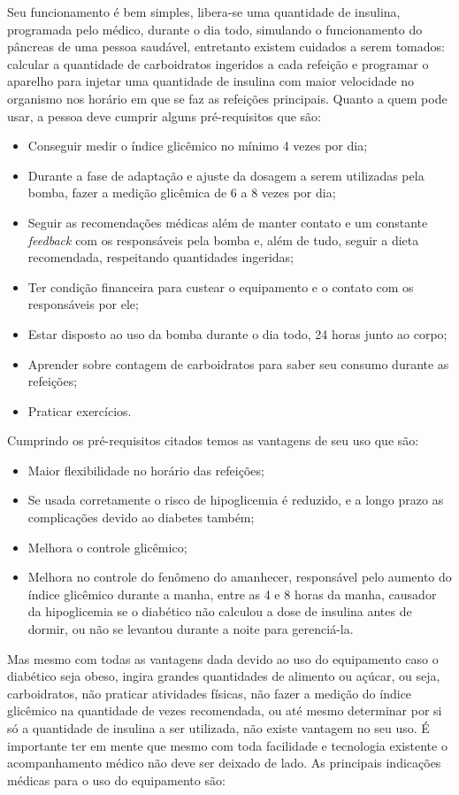 Seu funcionamento é bem simples, libera-se uma quantidade de insulina, programada pelo médico, durante o dia todo, simulando o funcionamento do pâncreas de uma pessoa saudável, entretanto existem cuidados a serem tomados: calcular a quantidade de carboidratos ingeridos a cada refeição e programar o aparelho para injetar uma quantidade de insulina com maior velocidade no organismo nos horário em que se faz as refeições principais.
Quanto a quem pode usar, a pessoa deve cumprir alguns pré-requisitos que são:
\begin{itemize}
\item Conseguir medir o índice glicêmico no mínimo 4 vezes por dia;
\item Durante a fase de adaptação e ajuste da dosagem a serem utilizadas pela bomba, fazer a medição glicêmica de 6 a 8 vezes por dia;
\item Seguir as recomendações médicas além de manter contato e um constante \emph{feedback} com os responsáveis pela bomba e, além de tudo, seguir a dieta recomendada, respeitando quantidades ingeridas;
\item Ter condição financeira para custear o equipamento e o contato com os responsáveis por ele;
\item Estar disposto ao uso da bomba durante o dia todo, 24 horas junto ao corpo;
\item Aprender sobre contagem de carboidratos para saber seu consumo durante as refeições;
\item Praticar exercícios.
\end{itemize}

Cumprindo os pré-requisitos citados temos as vantagens de seu uso que são:

\begin{itemize}
\item Maior flexibilidade no horário das refeições;
\item Se usada corretamente o risco de hipoglicemia é reduzido, e a longo prazo as complicações devido ao diabetes também;
\item Melhora o controle glicêmico;
\item Melhora no controle do fenômeno do amanhecer, responsável pelo aumento do índice glicêmico durante a manha, entre as 4 e 8 horas da manha, causador da hipoglicemia se o diabético não calculou a dose de insulina antes de dormir, ou não se levantou durante a noite para gerenciá-la.
\end{itemize}

Mas mesmo com todas as vantagens dada devido ao uso do equipamento caso o diabético seja obeso, ingira grandes quantidades de alimento ou açúcar, ou seja, carboidratos, não praticar atividades físicas, não fazer a medição do índice glicêmico na quantidade de vezes recomendada, ou até mesmo determinar por si só a quantidade de insulina a ser utilizada, não existe vantagem no seu uso.
É importante ter em mente que mesmo com toda facilidade e tecnologia existente o acompanhamento médico não deve ser deixado de lado. As principais indicações médicas para o uso do equipamento são:

